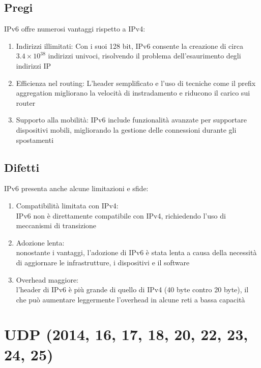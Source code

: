\documentclass[10pt,oneside,a4paper]{article}
\begin{document}
\subsection{Pregi}
IPv6 offre numerosi vantaggi rispetto a IPv4:
\begin{enumerate}
\item Indirizzi illimitati: Con i suoi 128 bit, IPv6 consente la creazione di circa $3.4 \times 10^{38}$ indirizzi univoci, risolvendo il problema dell'esaurimento degli indirizzi IP
\item Efficienza nel routing: L'header semplificato e l'uso di tecniche come il prefix aggregation migliorano la velocità di instradamento e riducono il carico sui router
\item Supporto alla mobilità: IPv6 include funzionalità avanzate per supportare dispositivi mobili, migliorando la gestione delle connessioni durante gli spostamenti
\end{enumerate}
\subsection{Difetti}
IPv6 presenta anche alcune limitazioni e sfide:
\begin{enumerate}
\item Compatibilità limitata con IPv4:\\
IPv6 non è direttamente compatibile con IPv4, richiedendo l'uso di meccanismi di transizione
\item Adozione lenta:\\
nonostante i vantaggi, l'adozione di IPv6 è stata lenta a causa della necessità di aggiornare le infrastrutture, i dispositivi e il software
\item Overhead maggiore:\\
l'header di IPv6 è più grande di quello di IPv4 (40 byte contro 20 byte), il che può aumentare leggermente l'overhead in alcune reti a bassa capacità
\end{enumerate}
\section{UDP (2014, 16, 17, 18, 20, 22, 23, 24, 25)}
\end{document}
